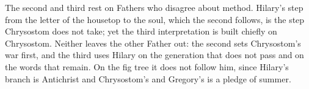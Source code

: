 The second and third rest on Fathers who disagree about method. Hilary's step
from the letter of the housetop to the soul, which the second follows, is the
step Chrysostom does not take; yet the third interpretation is built chiefly
on Chrysostom. Neither leaves the other Father out: the second sets
Chrysostom's war first, and the third uses Hilary on the generation that does
not pass and on the words that remain. On the fig tree it does not follow him,
since Hilary's branch is Antichrist and Chrysostom's and Gregory's is a pledge
of summer.
